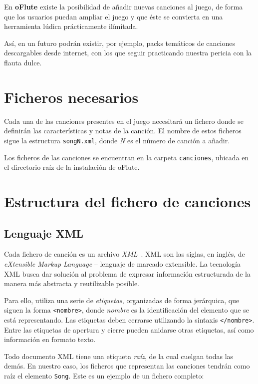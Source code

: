 En \textbf{oFlute} existe la posibilidad de añadir nuevas canciones al juego, de
forma que los usuarios puedan ampliar el juego y que éste se convierta en una
herramienta lúdica prácticamente ilímitada.

Así, en un futuro podrán existir, por ejemplo, packs temáticos de canciones
descargables desde internet, con los que seguir practicando nuestra pericia con
la flauta dulce.

\section{Ficheros necesarios}

Cada una de las canciones presentes en el juego necesitará un fichero donde se
definirán las características y notas de la canción. El nombre de estos ficheros
sigue la estructura \texttt{songN.xml}, donde \textit{N} es el número de canción
a añadir.

Los ficheros de las canciones se encuentran en la carpeta \texttt{canciones},
ubicada en el directorio raíz de la instalación de oFlute. 

\section{Estructura del fichero de canciones}

\subsection{Lenguaje XML}
\label{sec:lenguaje-xml}

Cada fichero de canción es un archivo \textit{XML}~\cite{XMLSpec}. XML
son las siglas, en inglés, de \textit{eXtensible Markup Language} -- lenguaje de
marcado extensible. La tecnología XML busca dar solución al problema de expresar
información estructurada de la manera más abstracta y reutilizable posible. 

Para ello, utiliza una serie de \textit{etiquetas}, organizadas de forma
jerárquica, que siguen la forma \texttt{<nombre>}, donde \textit{nombre} es la
identificación del elemento que se está representando. Las etiquetas deben
cerrarse utilizando la sintaxis \texttt{</nombre>}. Entre las etiquetas de
apertura y cierre pueden anidarse otras etiquetas, así como información en
formato texto.

Todo documento XML tiene una etiqueta \textit{raíz}, de la cual cuelgan todas
las demás. En nuestro caso, los ficheros que representan las canciones tendrán
como raíz el elemento \texttt{Song}. Este es un ejemplo de un fichero completo:



